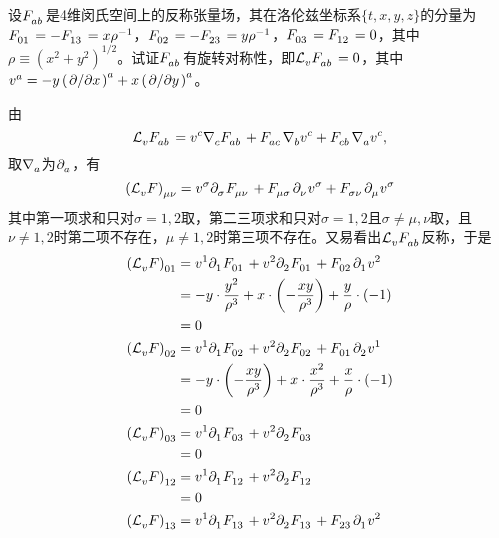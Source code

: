 \begin{xiti}
	\item 设$\tensor{F}{_a_b}$是4维闵氏空间上的反称张量场，其在洛伦兹坐标系$\{t,x,y,z \}$的分量为$\tensor{F}{_0_1}=-\tensor{F}{_1_3}=x \rho^{-1} $，$\tensor{F}{_0_2}=-\tensor{F}{_2_3}=y \rho^{-1} $，$\tensor{F}{_0_3}=\tensor{F}{_1_2}=0 $，其中$\rho\equiv \left(x^2+y^2\right)^{1/2} $。试证$\tensor{F}{_a_b}$有旋转对称性，即$\Ld{v} \tensor{F}{_a_b}=0 $，其中$\tensor{v}{^a}=-y \tensor{\left(\pd{x}\right)}{^a}+x \tensor{\left(\pd{y}\right)}{^a} $。

	\begin{zm}
		由\[\Ld{v} \tensor{F}{_a_b} = \tensor{v}{^c} \Nabla{c} \tensor{F}{_a_b} + \tensor{F}{_a_c} \Nabla{b} \tensor{v}{^c} + \tensor{F}{_c_b} \Nabla{a} \tensor{v}{^c},\]取$\Nabla{a}$为$\Partial{a}$，有\[  \tensor{\left(\Ld{v} F\right)}{_\mu_\nu} = \tensor{v}{^\sigma} \Partial{\sigma} \tensor{F}{_\mu_\nu} + \tensor{F}{_\mu_\sigma} \Partial{\nu} \tensor{v}{^\sigma} + \tensor{F}{_\sigma_\nu} \Partial{\mu} \tensor{v}{^\sigma}  \]其中第一项求和只对$\sigma=1,2$取，第二三项求和只对$\sigma=1,2$且$\sigma\neq\mu,\nu$取，且$\nu\neq1,2$时第二项不存在，$\mu\neq1,2$时第三项不存在。又易看出$\Ld{v} \tensor{F}{_a_b} $反称，于是
		\begin{align*}
		\tensor{\left(\Ld{v} F\right)}{_0_1} &= \tensor{v}{^1} \Partial{1} \tensor{F}{_0_1} + \tensor{v}{^2} \Partial{2} \tensor{F}{_0_1} + \tensor{F}{_0_2} \Partial{1} \tensor{v}{^2}\\
		&= -y \cdot \frac{y^2}{\rho^3} + x \cdot \left( - \frac{xy}{\rho^3} \right) +\frac{y}{\rho} \cdot (-1) \\
		&=0\\
		\tensor{\left(\Ld{v} F\right)}{_0_2} &= \tensor{v}{^1} \Partial{1} \tensor{F}{_0_2} + \tensor{v}{^2} \Partial{2} \tensor{F}{_0_2} + \tensor{F}{_0_1} \Partial{2} \tensor{v}{^1} \\
		&= -y \cdot \left( - \frac{xy}{\rho^3} \right) + x \cdot \frac{x^2}{\rho^3} + \frac{x}{\rho} \cdot (-1)\\
		&=0\\
		\tensor{\left(\Ld{v} F\right)}{_0_3} &= \tensor{v}{^1} \Partial{1} \tensor{F}{_0_3} + \tensor{v}{^2} \Partial{2} \tensor{F}{_0_3} \\
		&=0\\
		\tensor{\left(\Ld{v} F\right)}{_1_2} &= \tensor{v}{^1} \Partial{1} \tensor{F}{_1_2} + \tensor{v}{^2} \Partial{2} \tensor{F}{_1_2} \\
		&=0\\
		\tensor{\left(\Ld{v} F\right)}{_1_3} &= \tensor{v}{^1} \Partial{1} \tensor{F}{_1_3} + \tensor{v}{^2} \Partial{2} \tensor{F}{_1_3} + \tensor{F}{_2_3} \Partial{1} \tensor{v}{^2} \\

\end{align*}
\end{zm}
\end{xiti}
